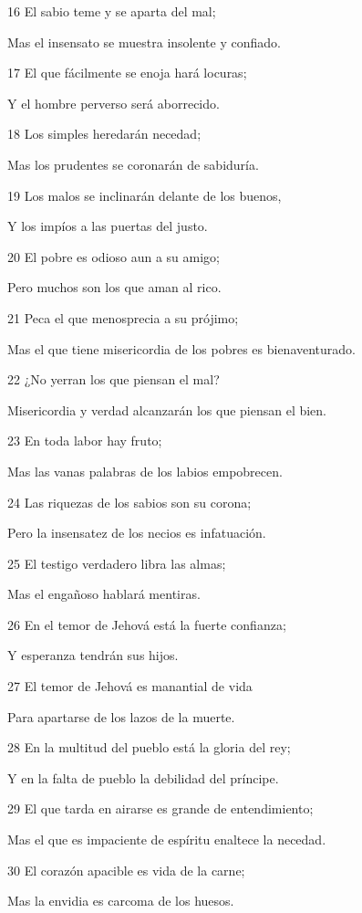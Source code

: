 \par 16 El sabio teme y se aparta del mal;
\par Mas el insensato se muestra insolente y confiado.
\par 17 El que fácilmente se enoja hará locuras;
\par Y el hombre perverso será aborrecido.
\par 18 Los simples heredarán necedad;
\par Mas los prudentes se coronarán de sabiduría.
\par 19 Los malos se inclinarán delante de los buenos,
\par Y los impíos a las puertas del justo.
\par 20 El pobre es odioso aun a su amigo;
\par Pero muchos son los que aman al rico.
\par 21 Peca el que menosprecia a su prójimo;
\par Mas el que tiene misericordia de los pobres es bienaventurado.
\par 22 ¿No yerran los que piensan el mal?
\par Misericordia y verdad alcanzarán los que piensan el bien.
\par 23 En toda labor hay fruto;
\par Mas las vanas palabras de los labios empobrecen.
\par 24 Las riquezas de los sabios son su corona;
\par Pero la insensatez de los necios es infatuación.
\par 25 El testigo verdadero libra las almas;
\par Mas el engañoso hablará mentiras.
\par 26 En el temor de Jehová está la fuerte confianza;
\par Y esperanza tendrán sus hijos.
\par 27 El temor de Jehová es manantial de vida
\par Para apartarse de los lazos de la muerte.
\par 28 En la multitud del pueblo está la gloria del rey;
\par Y en la falta de pueblo la debilidad del príncipe.
\par 29 El que tarda en airarse es grande de entendimiento;
\par Mas el que es impaciente de espíritu enaltece la necedad.
\par 30 El corazón apacible es vida de la carne;
\par Mas la envidia es carcoma de los huesos.
